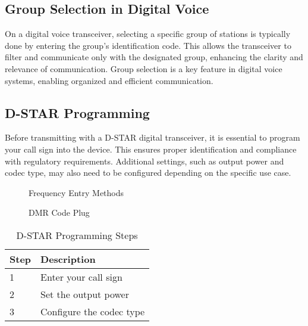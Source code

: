 \subsection*{Group Selection in Digital Voice}
On a digital voice transceiver, selecting a specific group of stations is typically done by entering the group's identification code. This allows the transceiver to filter and communicate only with the designated group, enhancing the clarity and relevance of communication. Group selection is a key feature in digital voice systems, enabling organized and efficient communication.

\subsection*{D-STAR Programming}
Before transmitting with a D-STAR digital transceiver, it is essential to program your call sign into the device. This ensures proper identification and compliance with regulatory requirements. Additional settings, such as output power and codec type, may also need to be configured depending on the specific use case.

\begin{figure}[h!]
    \centering
    \caption{Frequency Entry Methods}
    \label{fig:frequency_entry}
\end{figure}

\begin{figure}[h!]
    \centering
    \caption{DMR Code Plug}
    \label{fig:dmr_code_plug}
\end{figure}

\begin{table}[h!]
    \centering
    \begin{tabular}{|l|l|}
        \hline
        \textbf{Step} & \textbf{Description} \\
        \hline
        1 & Enter your call sign \\
        2 & Set the output power \\
        3 & Configure the codec type \\
        \hline
    \end{tabular}
    \caption{D-STAR Programming Steps}
    \label{tab:dstar_programming}
\end{table}

